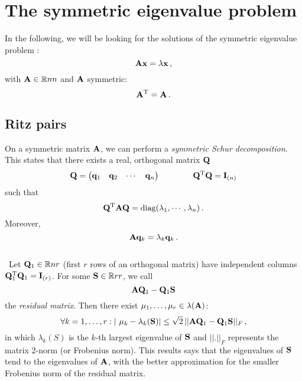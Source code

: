 \section{The symmetric eigenvalue problem}
In the following, we will be looking for the solutions of the symmetric eigenvalue problem \cite{golub}:
\begin{equation}
    \vb{A} \vb{x} = \lambda \vb{x} \thinspace ,
\end{equation}
with $\vb{A} \in \mathbb{R}{n}{n}$ and $\vb{A}$ symmetric:
\begin{equation}
    \vb{A}^\text{T} = \vb{A} \thinspace .
\end{equation}

\subsection{Ritz pairs} \label{sec:ritz}
    On a symmetric matrix $\vb{A}$, we can perform a \emph{symmetric Schur decomposition}. This states that there exists a real, orthogonal matrix $\vb{Q}$
    \begin{equation}
        \vb{Q} = \begin{pmatrix} \vb{q}_1 & \vb{q}_2 & \cdots & \vb{q}_n \end{pmatrix} \qquad \qquad \vb{Q}^\text{T} \vb{Q} = \vb{I}_{(n)}
    \end{equation}
    such that
    \begin{equation}
        \vb{Q}^\text{T} \vb{A} \vb{Q} = \operatorname{diag}(\lambda_1, \cdots, \lambda_n) \thinspace .
    \end{equation}
    Moreover,
    \begin{equation}
        \vb{A} \vb{q}_k = \lambda_k \vb{q}_k \thinspace .
    \end{equation}
    \\\
    Let $\vb{Q}_1 \in \mathbb{R}{n}{r}$ (first $r$ rows of an orthogonal matrix) have independent columns $\vb{Q}_1^\text{T} \vb{Q}_1 = \vb{I}_{(r)}$. For some $\vb{S} \in \mathbb{R}{r}{r}$, we call
    \begin{equation}
        \vb{A}\vb{Q}_1 - \vb{Q}_1 \vb{S}
    \end{equation}
    the \emph{residual matrix}. Then there exist $\mu_1, \dots, \mu_r \in \lambda(\vb{A})$:
    \begin{equation} \label{eq:mu_lambda_residue}
        \forall k=1, \dots, r: | \mu_k - \lambda_k(\vb{S})| \leq \sqrt{2} \thinspace || \vb{A}\vb{Q}_1 - \vb{Q}_1 \vb{S} ||_F \thinspace ,
    \end{equation}
    in which $\lambda_k(S)$ is the $k$-th largest eigenvalue of $\vb{S}$ and $||.||_F$ represents the matrix 2-norm (or Frobenius norm). This results says that the eigenvalues of $\vb{S}$ tend to the eigenvalues of $\vb{A}$, with the better approximation for the smaller Frobenius norm of the residual matrix.\\

